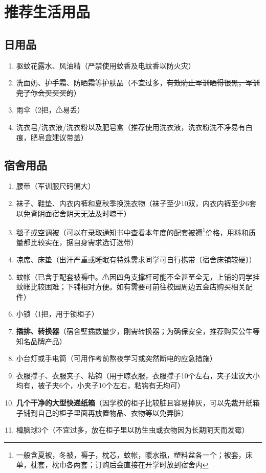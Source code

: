 \section[推荐生活用品]{推荐生活用品}

\subsection[日用品]{日用品}
\begin{enumerate}
    \item 驱蚊花露水、风油精（严禁使用蚊香及电蚊香以防火灾）
    \item 洗面奶、护手霜、防晒霜等护肤品（不宜过多，\sout{有效防止军训晒得很黑，军训完了你会买买买的}）
    \item 雨伞（2把，⚠易丢）
    \item 洗衣皂/洗衣液/洗衣粉以及肥皂盒（推荐使用洗衣液，洗衣粉洗不净易有白痕，肥皂盒建议带盖）
\end{enumerate}

\subsection[宿舍用品]{宿舍用品}
\begin{enumerate}
    \item 腰带（军训服尺码偏大）
    \item 袜子、鞋垫、内衣内裤和夏秋季换洗衣物（袜子至少10双，内衣内裤至少6套以免背阴面宿舍阴天无法及时晾干）
    \item 毯子或空调被（可以在录取通知书中查看本年度的配套被褥\footnote{一般含夏被，冬被，褥子，枕芯，蚊帐，暖水瓶，塑料盆各一个；被套，床单，枕套，枕巾各两套；订购后会直接在开学时放到宿舍内}价格，用料和质量都比较实在，据自身需求选订选带）
    \item 凉席、床垫（出汗严重或睡眠有特殊需求同学可自行携带〔宿舍床铺较硬〕）
    \item 蚊帐（已含于配套被褥中。⚠因四角支撑杆可能不全甚至全无，上铺的同学挂蚊帐比较困难；下铺相对方便。如有需要可前往校园周边五金店购买相关配件）
    \item 小锁（1把，用于锁柜子）
    \item \textbf{插排、转换器}（宿舍壁插数量少，刚需转换器；为确保安全，推荐购买公牛等知名品牌产品）
    \item 小台灯或手电筒（可用作考前熬夜学习或突然断电的应急措施）
    \item 衣服撑子、衣服夹子、粘钩（用于晾衣服，衣服撑子10个左右，夹子建议大小均有，被子夹6个，小夹子10个左右，粘钩有无均可）
    \item \textbf{几个干净的大型快递纸箱}（因学校的柜子比较脏且容易掉灰，可以先裁开纸箱子铺到自己的柜子里面再放置物品、衣物等以免弄脏）
    \item 樟脑球3个（不宜过多，放在柜子里以防生虫或衣物因为长期阴天而发霉）
\end{enumerate}


